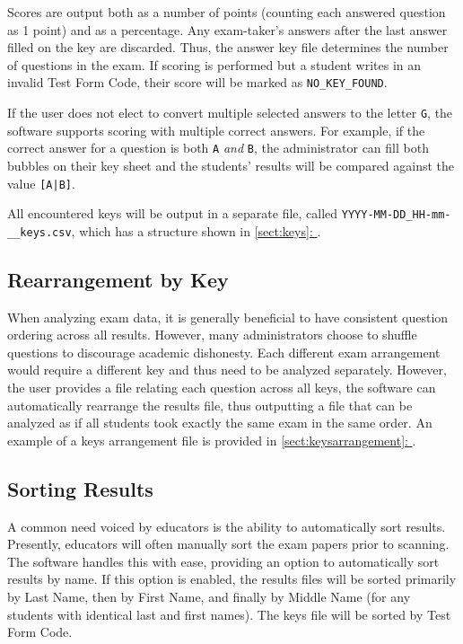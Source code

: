 \documentclass[12pt, letterpaper]{report}
\newcommand*{\sectref}[1]{\hypersetup{linkcolor=usfgreen}\hyperref[{#1}]{\ref*{#1}: \nameref*{#1}}}
\begin{document}
Scores are output both as a number of points (counting each answered question
as 1 point) and as a percentage. Any exam-taker's answers after the last answer
filled on the key are discarded. Thus, the answer key file determines the number
of questions in the exam. If scoring is performed but a student writes in an
invalid Test Form Code, their score will be marked as \verb!NO_KEY_FOUND!.

If the user does not elect to convert multiple selected answers to the letter
\verb!G!, the software supports scoring with multiple correct answers. For
example, if the correct answer for a question is both \verb!A! \textit{and} \verb!B!,
the administrator can fill both bubbles on their key sheet and the students'
results will be compared against the value \verb![A|B]!.

All encountered keys will be output in a separate file, called
\verb!YYYY-MM-DD_HH-mm-__keys.csv!, which has a structure shown in
\sectref{sect:keys}.

\subsection{Rearrangement by Key}
\label{sect:rearranging}
When analyzing exam data, it is generally beneficial to have consistent
question ordering across all results. However, many administrators choose to
shuffle questions to discourage academic dishonesty. Each different exam
arrangement would require a different key and thus need to be analyzed separately.
However, the user provides a file relating each question across all keys, the
software can automatically rearrange the results file, thus outputting a file
that can be analyzed as if all students took exactly the same exam in the same
order. An example of a keys arrangement file is provided in
\sectref{sect:keysarrangement}.

\subsection{Sorting Results}
A common need voiced by educators is the ability to automatically sort results.
Presently, educators will often manually sort the exam papers prior to scanning.
The software handles this with ease, providing an option to automatically sort
results by name. If this option is enabled, the results files will be sorted
primarily by Last Name, then by First Name, and finally by Middle Name (for any
students with identical last and first names). The keys file will be sorted by
Test Form Code.
\end{document}
